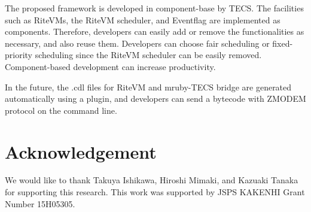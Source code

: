 \documentclass{sig-alternate-05-2015}
\begin{document}
The proposed framework is developed in component-base by TECS.
The facilities such as RiteVMs, the RiteVM scheduler, and Eventflag are implemented as components.
Therefore, developers can easily add or remove the functionalities as necessary, and also reuse them.
Developers can choose fair scheduling or fixed-priority scheduling since the RiteVM scheduler can be easily removed.
Component-based development can increase productivity.

In the future, the .cdl files for RiteVM and mruby-TECS bridge are generated automatically using a plugin, and developers can send a bytecode with ZMODEM protocol on the command line.

\section{Acknowledgement}
We would like to thank Takuya Ishikawa, Hiroshi Mimaki, and Kazuaki Tanaka for supporting this research.
This work was supported by JSPS KAKENHI Grant Number 15H05305.


\end{document}
